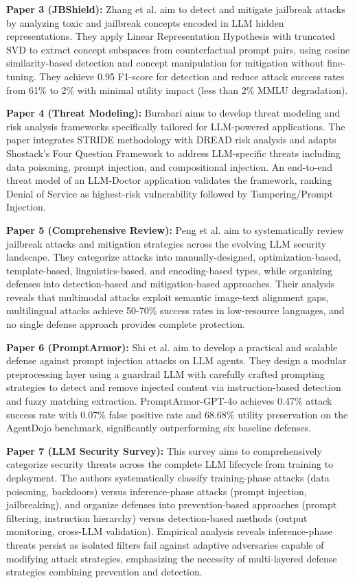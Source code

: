 \documentclass[conference]{IEEEtran}
\begin{document}
\textbf{Paper 3 (JBShield):} Zhang et al. aim to detect and mitigate jailbreak attacks by analyzing toxic and jailbreak concepts encoded in LLM hidden representations. They apply Linear Representation Hypothesis with truncated SVD to extract concept subspaces from counterfactual prompt pairs, using cosine similarity-based detection and concept manipulation for mitigation without fine-tuning. They achieve 0.95 F1-score for detection and reduce attack success rates from 61\% to 2\% with minimal utility impact (less than 2\% MMLU degradation).

\textbf{Paper 4 (Threat Modeling):} Burabari aims to develop threat modeling and risk analysis frameworks specifically tailored for LLM-powered applications. The paper integrates STRIDE methodology with DREAD risk analysis and adapts Shostack's Four Question Framework to address LLM-specific threats including data poisoning, prompt injection, and compositional injection. An end-to-end threat model of an LLM-Doctor application validates the framework, ranking Denial of Service as highest-risk vulnerability followed by Tampering/Prompt Injection.

\textbf{Paper 5 (Comprehensive Review):} Peng et al. aim to systematically review jailbreak attacks and mitigation strategies across the evolving LLM security landscape. They categorize attacks into manually-designed, optimization-based, template-based, linguistics-based, and encoding-based types, while organizing defenses into detection-based and mitigation-based approaches. Their analysis reveals that multimodal attacks exploit semantic image-text alignment gaps, multilingual attacks achieve 50-70\% success rates in low-resource languages, and no single defense approach provides complete protection.

\textbf{Paper 6 (PromptArmor):} Shi et al. aim to develop a practical and scalable defense against prompt injection attacks on LLM agents. They design a modular preprocessing layer using a guardrail LLM with carefully crafted prompting strategies to detect and remove injected content via instruction-based detection and fuzzy matching extraction. PromptArmor-GPT-4o achieves 0.47\% attack success rate with 0.07\% false positive rate and 68.68\% utility preservation on the AgentDojo benchmark, significantly outperforming six baseline defenses.

\textbf{Paper 7 (LLM Security Survey):} This survey aims to comprehensively categorize security threats across the complete LLM lifecycle from training to deployment. The authors systematically classify training-phase attacks (data poisoning, backdoors) versus inference-phase attacks (prompt injection, jailbreaking), and organize defenses into prevention-based approaches (prompt filtering, instruction hierarchy) versus detection-based methods (output monitoring, cross-LLM validation). Empirical analysis reveals inference-phase threats persist as isolated filters fail against adaptive adversaries capable of modifying attack strategies, emphasizing the necessity of multi-layered defense strategies combining prevention and detection.
\end{document}

